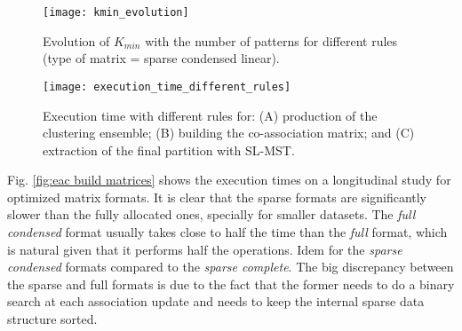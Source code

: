 \begin{figure}[hbt!]
    \centering
    \texttt{[image: kmin\_evolution]}
    \caption{Evolution of $K_{min}$ with the number of patterns for different rules (type of matrix = sparse condensed linear).}
    \label{fig:eac kmin evo}
\end{figure}

\begin{figure*}[hbt!]
    \centering
    \texttt{[image: execution\_time\_different\_rules]}
    \caption{Execution time with different rules for: (A) production of the clustering ensemble; (B) building the co-association matrix; and (C) extraction of the final partition with SL-MST.}
    \label{fig:eac ensemble times}
\end{figure*}



Fig. \ref{fig:eac build matrices} shows the execution times on a longitudinal study for optimized matrix formats.
It is clear that the sparse formats are significantly slower than the fully allocated ones, specially for smaller datasets.
The \emph{full condensed} format usually takes close to half the time than the \emph{full} format, which is natural given that it performs half the operations.
Idem for the \emph{sparse condensed} formats compared to the \emph{sparse complete}.
The big discrepancy between the sparse and full formats is due to the fact that the former needs to do a binary search at each association update and needs to keep the internal sparse data structure sorted.


